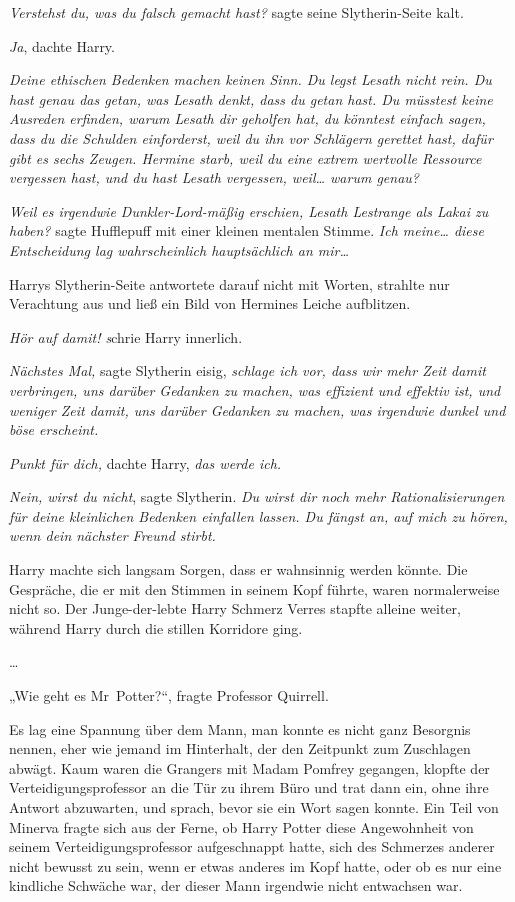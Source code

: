 {\emph{Verstehst du, was du falsch gemacht hast?} sagte seine Slytherin-Seite kalt.

\emph{Ja}, dachte Harry.

\emph{Deine ethischen Bedenken machen keinen Sinn. Du legst Lesath nicht rein. Du hast genau das getan, was Lesath denkt, dass du getan hast. Du müsstest keine Ausreden erfinden, warum Lesath dir geholfen hat, du könntest einfach sagen, dass du die Schulden einforderst, weil du ihn vor Schlägern gerettet hast, dafür gibt es sechs Zeugen. Hermine starb, weil du eine extrem wertvolle Ressource vergessen hast, und du hast Lesath vergessen, weil… warum genau?}

\emph{Weil es irgendwie Dunkler-Lord-mäßig erschien, Lesath Lestrange als Lakai zu haben?} sagte Hufflepuff mit einer kleinen mentalen Stimme. \emph{Ich meine… diese Entscheidung lag wahrscheinlich hauptsächlich an mir…}

Harrys Slytherin-Seite antwortete darauf nicht mit Worten, strahlte nur Verachtung aus und ließ ein Bild von Hermines Leiche aufblitzen.

\emph{Hör auf damit! s}chrie Harry innerlich.

\emph{Nächstes Mal,} sagte Slytherin eisig, \emph{schlage ich vor, dass wir mehr Zeit damit verbringen, uns darüber Gedanken zu machen, was effizient und effektiv ist, und weniger Zeit damit, uns darüber Gedanken zu machen, was irgendwie dunkel und böse erscheint.}

\emph{Punkt für dich,} dachte Harry, \emph{das werde ich.}

\emph{Nein, wirst du nicht}, sagte Slytherin. \emph{Du wirst dir noch mehr Rationalisierungen für deine kleinlichen Bedenken einfallen lassen. Du fängst an, auf mich zu hören, wenn dein nächster Freund stirbt.}

Harry machte sich langsam Sorgen, dass er wahnsinnig werden könnte. Die Gespräche, die er mit den Stimmen in seinem Kopf führte, waren normalerweise nicht so. Der Junge-der-lebte Harry Schmerz Verres stapfte alleine weiter, während Harry durch die stillen Korridore ging.

…

„Wie geht es Mr~Potter?“, fragte Professor Quirrell.

Es lag eine Spannung über dem Mann, man konnte es nicht ganz Besorgnis nennen, eher wie jemand im Hinterhalt, der den Zeitpunkt zum Zuschlagen abwägt. Kaum waren die Grangers mit Madam Pomfrey gegangen, klopfte der Verteidigungsprofessor an die Tür zu ihrem Büro und trat dann ein, ohne ihre Antwort abzuwarten, und sprach, bevor sie ein Wort sagen konnte. Ein Teil von Minerva fragte sich aus der Ferne, ob Harry Potter diese Angewohnheit von seinem Verteidigungsprofessor aufgeschnappt hatte, sich des Schmerzes anderer nicht bewusst zu sein, wenn er etwas anderes im Kopf hatte, oder ob es nur eine kindliche Schwäche war, der dieser Mann irgendwie nicht entwachsen war.

}
